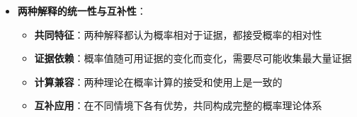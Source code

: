 \begin{center}
{{\begin{itemize}
\begin{itemize}
  \item \textbf{应用领域}：特别适合统计研究，如保险精算、医学统计、质量控制
  \item \textbf{计算基础}：基于观察数据和统计分析，分子为具有属性的对象数，分母为总体数
  \item \textbf{总体选择}：关键步骤是选择最合适的研究总体，不同总体产生不同概率
  \end{itemize}
\item \textbf{两种解释的统一性与互补性}：
  \begin{itemize}
  \item \textbf{共同特征}：两种解释都认为概率相对于证据，都接受概率的相对性
  \item \textbf{证据依赖}：概率值随可用证据的变化而变化，需要尽可能收集最大量证据
  \item \textbf{计算兼容}：两种理论在概率计算的接受和使用上是一致的
  \item \textbf{互补应用}：在不同情境下各有优势，共同构成完整的概率理论体系
  \end{itemize}
\end{itemize}
}}
\end{center}